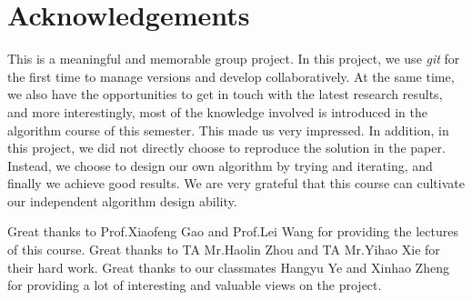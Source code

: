 \section*{Acknowledgements}
This is a meaningful and memorable group project. In this project, we use \emph{git} for the first time to manage versions and develop collaboratively. At the same time, we also have the opportunities to get in touch with the latest research results, and more interestingly, most of the knowledge involved is introduced in the algorithm course of this semester. This made us very impressed. In addition, in this project, we did not directly choose to reproduce the solution in the paper. Instead, we choose to design our own algorithm by trying and iterating, and finally we achieve good results. We are very grateful that this course can cultivate our independent algorithm design ability.

Great thanks to Prof.Xiaofeng Gao and Prof.Lei Wang for providing the lectures of this course. Great thanks to TA Mr.Haolin Zhou and TA Mr.Yihao Xie for their hard work. Great thanks to our classmates Hangyu Ye and Xinhao Zheng for providing a lot of interesting and valuable views on the project.
